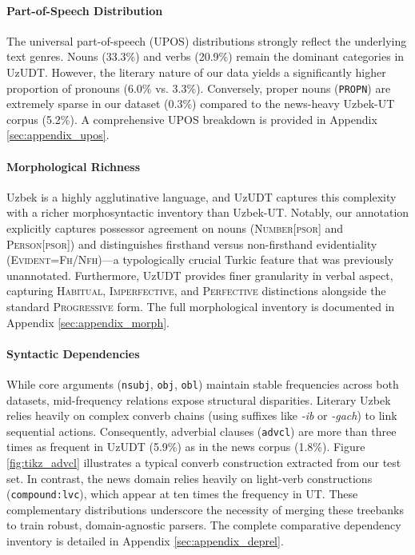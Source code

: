\documentclass[10pt, a4paper]{article}
\begin{document}
\paragraph{Part-of-Speech Distribution}
The universal part-of-speech (UPOS) distributions strongly reflect the underlying text genres. Nouns (33.3\%) and verbs (20.9\%) remain the dominant categories in UzUDT. However, the literary nature of our data yields a significantly higher proportion of pronouns (6.0\% vs. 3.3\%). Conversely, proper nouns (\texttt{PROPN}) are extremely sparse in our dataset (0.3\%) compared to the news-heavy Uzbek-UT corpus (5.2\%). A comprehensive UPOS breakdown is provided in Appendix \ref{sec:appendix_upos}.

\paragraph{Morphological Richness}
Uzbek is a highly agglutinative language, and UzUDT captures this complexity with a richer morphosyntactic inventory than Uzbek-UT. Notably, our annotation explicitly captures possessor agreement on nouns (\textsc{Number[psor]} and \textsc{Person[psor]}) and distinguishes firsthand versus non-firsthand evidentiality (\textsc{Evident=Fh/Nfh})—a typologically crucial Turkic feature that was previously unannotated. Furthermore, UzUDT provides finer granularity in verbal aspect, capturing \textsc{Habitual}, \textsc{Imperfective}, and \textsc{Perfective} distinctions alongside the standard \textsc{Progressive} form. The full morphological inventory is documented in Appendix \ref{sec:appendix_morph}.

\paragraph{Syntactic Dependencies}
While core arguments (\texttt{nsubj}, \texttt{obj}, \texttt{obl}) maintain stable frequencies across both datasets, mid-frequency relations expose structural disparities. Literary Uzbek relies heavily on complex converb chains (using suffixes like \textit{-ib} or \textit{-gach}) to link sequential actions. Consequently, adverbial clauses (\texttt{advcl}) are more than three times as frequent in UzUDT (5.9\%) as in the news corpus (1.8\%). Figure \ref{fig:tikz_advcl} illustrates a typical converb construction extracted from our test set. In contrast, the news domain relies heavily on light-verb constructions (\texttt{compound:lvc}), which appear at ten times the frequency in UT. These complementary distributions underscore the necessity of merging these treebanks to train robust, domain-agnostic parsers. The complete comparative dependency inventory is detailed in Appendix \ref{sec:appendix_deprel}.
\end{document}
